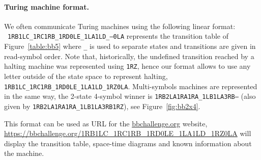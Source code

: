 \paragraph*{Turing machine format.} We often communicate Turing machines using the following linear format: \\ \texttt{1RB1LC\_1RC1RB\_1RD0LE\_1LA1LD\_---0LA} represents the transition table of Figure~\ref{table:bb5} where \texttt{\_} is used to separate states and transitions are given in read-symbol order. Note that, historically, the undefined transition reached by a halting machine was represented using \texttt{1RZ}, hence our format allows to use any letter outside of the state space to represent halting, \eg \texttt{1RB1LC\_1RC1RB\_1RD0LE\_1LA1LD\_1RZ0LA}. Multi-symbols machines are represented in the same way, \eg the 2-state 4-symbol \BBfull winner is \texttt{1RB2LA1RA1RA\_1LB1LA3RB---} (also given by \texttt{1RB2LA1RA1RA\_1LB1LA3RB1RZ}), see Figure~\ref{fig:bb2x4}.

This format can be used as URL for the \url{bbchallenge.org} website, \eg \url{https://bbchallenge.org/1RB1LC\_1RC1RB\_1RD0LE\_1LA1LD\_1RZ0LA} will display the transition table, space-time diagrams and known information about the machine.

